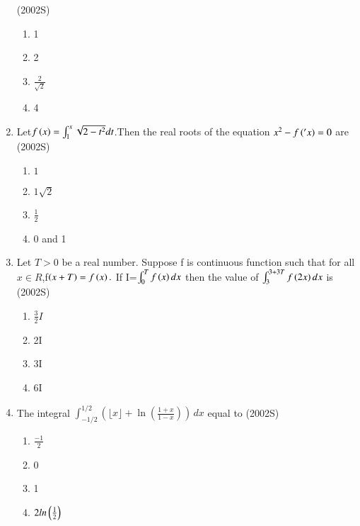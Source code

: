 \documentclass[journal,12pt,twocolumn]{IEEEtran}
\theoremstyle{remark}
\begin{document}
\begin{enumerate}
	\hfill(2002S)
\begin{enumerate}
 \item  1
 \item  2
 \item  $\frac{2}{\sqrt{2}}$
 \item  4
\end{enumerate}
\item Let$f\left(x\right)=\int_{1}^{x}\sqrt{2-{t}^2} dt $.Then the real roots of the equation ${x}^2-f\left('x\right)=0$ are 
	\hfill(2002S)
\begin{enumerate}
  \item ${1}$
  \item ${1}{\sqrt2}$
  \item $\frac{1}{2}$
   \item 0 and 1
   \end{enumerate}
   \item Let $T>0$ be a real number. Suppose f is continuous function such that for all ${x}\in{R}$,f$\left(x+T\right)=f\left(x\right).$
   If I=$\int_{0}^{T}f\left(x\right)dx$ then the value of $\int_{3}^{3+3T} f\left(2x\right) dx $ is
		\hfill(2002S)
\begin{enumerate}
	\item $\frac{3}{2}{I}$
   \item 2I
   \item 3I
   \item 6I
   \end{enumerate}
   \item The integral $\int_{-1/2}^{1/2} \left( \lfloor x \rfloor + \ln \left( \frac{1+x}{1-x} \right) \right) \, dx$ equal to
	   \hfill(2002S)
\begin{enumerate}[label=(\alph*)]
	\item $\frac{-1}{2}$
 \item 0
 \item 1
 \item $2ln\left(\frac{1}{2}\right)$
 \end{enumerate}




\end{enumerate}
\end{document}
